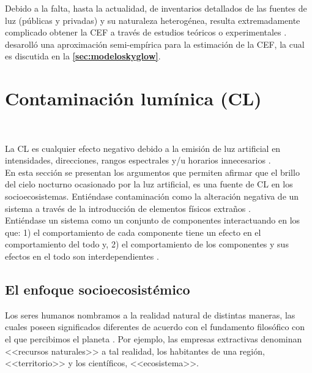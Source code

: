 Debido a la falta, hasta la actualidad, de inventarios detallados de las fuentes de luz (públicas y privadas) y su naturaleza heterogénea, resulta extremadamente complicado obtener la CEF a través de estudios teóricos o experimentales \citep{Kocifaj2014}. \cite{Garstang1986} desarolló una aproximación semi-empírica para la estimación de la CEF, la cual es discutida en la \textbf{\autoref{sec:modeloskyglow}}.

\newpage

\section{Contaminación lumínica (CL)}\\
\label{sec:contaminacionluminica}

La CL es cualquier efecto negativo debido a la emisión de luz artificial en intensidades, direcciones, rangos espectrales y/u horarios innecesarios \citep{AtlasREPSA,LibroCL,Stone2017}.\\

En esta sección se presentan los argumentos que permiten afirmar que el brillo del cielo nocturno ocasionado por la luz artificial, es una fuente de CL en los socioecosistemas. Entiéndase contaminación como la alteración negativa de un sistema a través de la introducción de elementos físicos extraños \citep{AtlasREPSA,LibroCL}.\\

Entiéndase un sistema como un conjunto de componentes interactuando en los que: 1) el comportamiento de cada componente tiene un efecto en el comportamiento del todo y, 2) el comportamiento de los componentes y sus efectos en el todo son interdependientes \citep{Avila2019}.\\

\subsection{El enfoque socioecosistémico}
\label{subsec:enfoquesocioecosistemico}

Los seres humanos nombramos a la realidad natural de distintas maneras, las cuales poseen significados diferentes de acuerdo con el fundamento filosófico con el que percibimos el planeta \citep{Avila2019,Uribe2014}. Por ejemplo, las empresas extractivas denominan <<recursos naturales>> a tal realidad, los habitantes de una región, <<territorio>> y los científicos, <<ecosistema>>.\\

